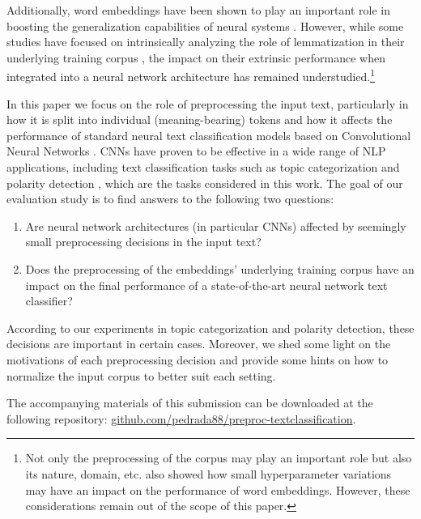 \documentclass[11pt,a4paper]{article}
\begin{document}
Additionally, word embeddings have been shown to play an important role in boosting the generalization capabilities of neural systems \cite{goldberg2016primer,CamachoColladosPilehvar:2018survey}. However, while some studies have focused on intrinsically analyzing the role of lemmatization in their underlying training corpus \cite{ebert2016lamb,kuznetsov2018text}, the impact on their extrinsic performance when integrated into a neural network architecture has remained understudied.\footnote{Not only the preprocessing of the corpus may play an important role but also its nature, domain, etc.  also showed how small hyperparameter variations may have an impact on the performance of word embeddings. However, these considerations remain out of the scope of this paper.}



In this paper we focus on the role of preprocessing the input text, particularly in how it is split into individual (meaning-bearing) tokens and how it affects the performance of standard neural text classification models based on Convolutional Neural Networks \cite[CNN]{lecun2010convolutional,kim2014convolutional}. 
CNNs have proven to be effective in a wide range of NLP applications, including text classification tasks such as topic categorization \cite{johnson2015effective,tang2015document,XiaoCho:2016,conneau-EtAl:2017:EACLlong} and polarity detection \cite{kalchbrenner2014convolutional,kim2014convolutional,dos2014deep,yin2017comparative}, which are the tasks considered in this work. 
The goal of our evaluation study is to find answers to the following two questions:\begin{enumerate}
\item Are neural network architectures (in particular CNNs) affected by seemingly small preprocessing decisions in the input text?     
\item Does the preprocessing of the embeddings' underlying training corpus have an impact on the final performance of a state-of-the-art neural network text classifier?
\end{enumerate}



According to our experiments in topic categorization and polarity detection, these decisions are important in certain cases. 
Moreover, we shed some light on the motivations of each preprocessing decision and provide some hints on how to normalize the input corpus to better suit each setting.

The accompanying materials of this submission can be downloaded at the following repository: \url{github.com/pedrada88/preproc-textclassification}.
\end{document}
